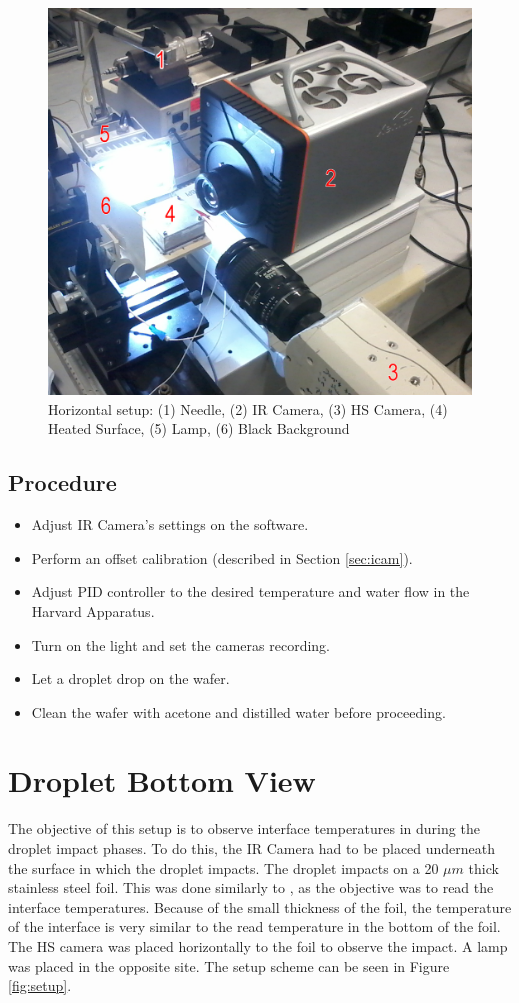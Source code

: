 \begin{figure}[h]
\centering
\includegraphics[width=0.65\linewidth]{Figures/3.Chapter/horizontal.png}
\caption{Horizontal setup: (1) Needle, (2) IR Camera, (3) HS Camera, (4) Heated Surface, (5) Lamp, (6) Black Background}
\label{fig:horizontal}
\end{figure}

\subsection{Procedure}
\label{sec:procedure}
\begin{itemize}
\item Adjust IR Camera's settings on the software.
\item Perform an offset calibration (described in Section \ref{sec:icam}).
\item Adjust PID controller to the desired temperature and water flow in the Harvard Apparatus.
\item Turn on the light and set the cameras recording.
\item Let a droplet drop on the wafer.
\item Clean the wafer with acetone and distilled water before proceeding.
\end{itemize}

\section{Droplet Bottom View}

\par The objective of this setup is to observe interface temperatures in during the droplet impact phases. To do this, the IR Camera had to be placed underneath the surface in which the droplet impacts. The droplet impacts on a 20 $\mu m$ thick stainless steel foil. This was done similarly to \cite{sielaff2014experimental}, as the objective was to read the interface temperatures. Because of the small thickness of the foil, the temperature of the interface is very similar to the read temperature in the bottom of the foil. The HS camera was placed horizontally to the foil to observe the impact. A lamp was placed in the opposite site. The setup scheme can be seen in Figure \ref{fig:setup}.\\

